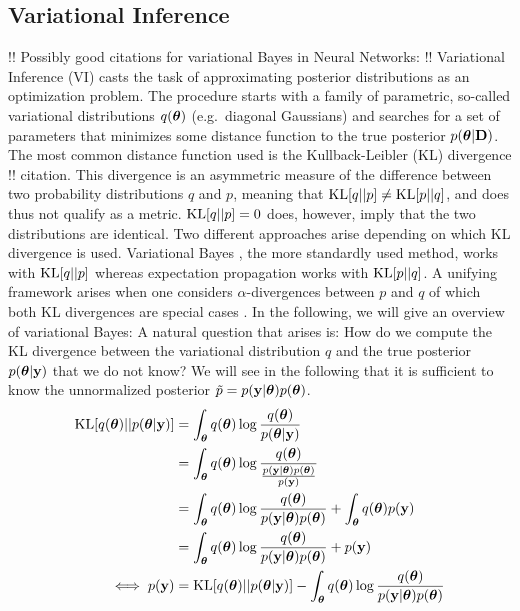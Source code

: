 \documentclass[../thesis.tex]{subfiles}
\begin{document}
\subsection*{Variational Inference}
!! Possibly good citations for variational Bayes in Neural Networks: \parencite{hinton1993keeping, mackay1995developments, graves2011practical} !!
Variational Inference (VI) casts the task of approximating posterior distributions as an optimization problem. The procedure starts with a family of parametric, so-called variational distributions $q(\boldsymbol{\mathbf{\theta}})$ (e.g.\ diagonal Gaussians) and searches for a set of parameters that minimizes some distance function to the true posterior $p(\boldsymbol{\mathbf{\theta}}|\boldsymbol{\mathbf{D}})$. The most common distance function used is the Kullback-Leibler (KL) divergence !! citation. This divergence is an asymmetric measure of the difference between two probability distributions $q$ and $p$, meaning that $\operatorname{KL}[q||p]\neq \operatorname{KL}[p||q]$, and does thus not qualify as a metric. $\operatorname{KL}[q||p]=0$ does, however, imply that the two distributions are identical. Two different approaches arise depending on which KL divergence is used. Variational Bayes \parencite{attias1999inferring}, the more standardly used method, works with $\operatorname{KL}[q||p]$ whereas expectation propagation \parencite{minka2001expectation} works with $\operatorname{KL}[p||q]$. A unifying framework arises when one considers $\alpha$-divergences between $p$ and $q$ of which both KL divergences are special cases \parencite{hernandez2016black}. In the following, we will give an overview of variational Bayes:
A natural question that arises is: How do we compute the KL divergence between the variational distribution $q$ and the true posterior $p(\boldsymbol{\mathbf{\theta}} | \boldsymbol{\mathbf{y}})$ that we do not know? We will see in the following that it is sufficient to know the unnormalized posterior $\tilde{p} = p(\boldsymbol{\mathbf{y}} | \boldsymbol{\mathbf{\theta}}) p(\boldsymbol{\mathbf{\theta}})$.
\begin{align}
    \operatorname{KL}[q(\boldsymbol{\mathbf{\theta}})||p(\boldsymbol{\mathbf{\theta}} | \boldsymbol{\mathbf{y}})] &= \int_{\boldsymbol{\mathbf{\theta}}} q(\boldsymbol{\mathbf{\theta}}) \log \frac{q(\boldsymbol{\mathbf{\theta}})} {p(\boldsymbol{\mathbf{\theta}} | \boldsymbol{\mathbf{y}})} \\
    &= \int_{\boldsymbol{\mathbf{\theta}}} q(\boldsymbol{\mathbf{\theta}}) \log \frac{q(\boldsymbol{\mathbf{\theta}})}  {\frac{p(\boldsymbol{\mathbf{y}} | \boldsymbol{\mathbf{\theta}}) p(\boldsymbol{\mathbf{\theta}})} {p(\boldsymbol{\mathbf{y}})}} \\
    &= \int_{\boldsymbol{\mathbf{\theta}}} q(\boldsymbol{\mathbf{\theta}}) \log \frac{q(\boldsymbol{\mathbf{\theta}})}{p(\boldsymbol{\mathbf{y}} | \boldsymbol{\mathbf{\theta}}) p(\boldsymbol{\mathbf{\theta}})}  +  \int_{\boldsymbol{\mathbf{\theta}}} q(\boldsymbol{\mathbf{\theta}}) p(\boldsymbol{\mathbf{y}}) \\
    &= \int_{\boldsymbol{\mathbf{\theta}}} q(\boldsymbol{\mathbf{\theta}}) \log \frac{q(\boldsymbol{\mathbf{\theta}})}{p(\boldsymbol{\mathbf{y}} | \boldsymbol{\mathbf{\theta}}) p(\boldsymbol{\mathbf{\theta}})}  +   p(\boldsymbol{\mathbf{y}}) \\
\iff p(\boldsymbol{\mathbf{y}}) &= \operatorname{KL}[q(\boldsymbol{\mathbf{\theta}})||p(\boldsymbol{\mathbf{\theta}} | \boldsymbol{\mathbf{y}})]  -  \int_{\boldsymbol{\mathbf{\theta}}} q(\boldsymbol{\mathbf{\theta}}) \log \frac{q(\boldsymbol{\mathbf{\theta}})}{p(\boldsymbol{\mathbf{y}} | \boldsymbol{\mathbf{\theta}}) p(\boldsymbol{\mathbf{\theta}})}
\end{align}
\end{document}
